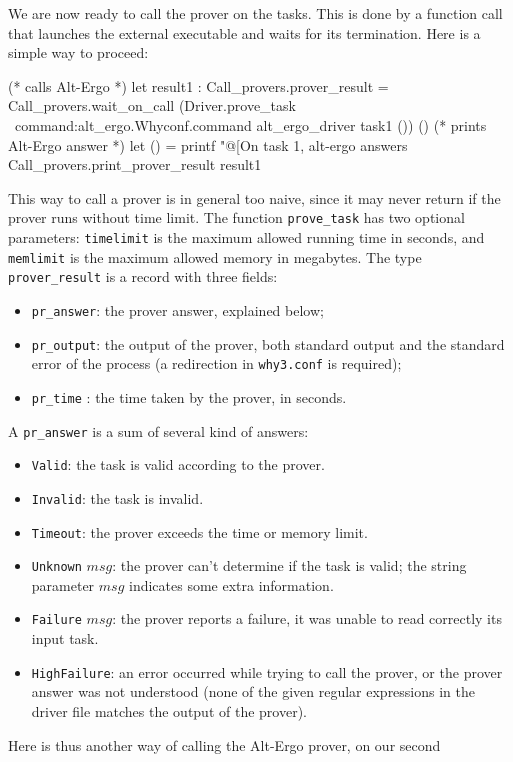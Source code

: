 We are now ready to call the prover on the tasks. This is done by a
function call that launches the external executable and waits for its
termination. Here is a simple way to proceed:
\begin{ocamlcode}
(* calls Alt-Ergo *)
let result1 : Call_provers.prover_result =
  Call_provers.wait_on_call
    (Driver.prove_task ~command:alt_ergo.Whyconf.command
    alt_ergo_driver task1 ()) ()
(* prints Alt-Ergo answer *)
let () = printf "@[On task 1, alt-ergo answers %
  Call_provers.print_prover_result result1
\end{ocamlcode}
This way to call a prover is in general too naive, since it may never
return if the prover runs without time limit. The function
\texttt{prove\_task} has two optional parameters: \texttt{timelimit}
is the maximum allowed running time in seconds, and \texttt{memlimit}
is the maximum allowed memory in megabytes.  The type
\texttt{prover\_result} is a record with three fields:
\begin{itemize}
\item \texttt{pr\_answer}: the prover answer, explained below;
\item \texttt{pr\_output}: the output of the prover, \ie both
  standard output and the standard error of the process
  (a redirection in \texttt{why3.conf} is required);
\item \texttt{pr\_time} : the time taken by the prover, in seconds.
\end{itemize}
A \texttt{pr\_answer} is a sum of several kind of answers:
\begin{itemize}
\item \texttt{Valid}: the task is valid according to the prover.
\item \texttt{Invalid}: the task is invalid.
\item \texttt{Timeout}: the prover exceeds the time or memory limit.
\item \texttt{Unknown} $msg$: the prover can't determine if the task
  is valid; the string parameter $msg$ indicates some extra
  information.
\item \texttt{Failure} $msg$: the prover reports a failure, \ie it
  was unable to read correctly its input task.
\item \texttt{HighFailure}: an error occurred while trying to call the
  prover, or the prover answer was not understood (\ie none of the
  given regular expressions in the driver file matches the output
  of the prover).
\end{itemize}
Here is thus another way of calling the Alt-Ergo prover, on our second

